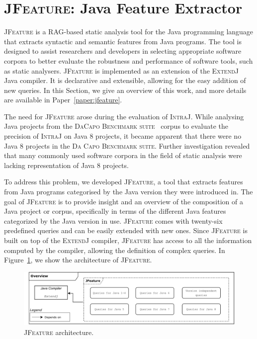 \section{\textsc{JFeature}: Java Feature Extractor}
\label{sec:JFeature}
\textsc{JFeature} is a RAG-based static analysis tool for the Java programming language that extracts
syntactic and semantic features from Java programs. The tool is designed to assist
researchers and developers in selecting appropriate software corpora to better evaluate the robustness
and performance of software tools, such as static analysers.
\textsc{JFeature} is implemented as an extension of the \textsc{ExtendJ} Java compiler. It is declarative
and extensible, allowing for the easy addition of new queries. In this Section,
we give an overview of this work, and more details are available in Paper~\ref{paper:jfeature}.

The need for \textsc{JFeature} arose during the evaluation of \textsc{IntraJ}.
While analysing Java projects from the \textsc{DaCapo Benchmark suite}~\cite{DaCapo:paper} corpus to evaluate the precision
of \textsc{IntraJ} on Java 8 projects, it became apparent that there were no Java 8 projects
in the \textsc{Da Capo Benchmark suite}. Further investigation revealed that many
commonly used software corpora in the field of static analysis were lacking
representation of Java 8 projects.

To address this problem, we developed \textsc{JFeature}, a tool that extracts features from
Java programs categorised by the Java version they were introduced in.
The goal of \textsc{JFeature} is to provide insight and an overview of
the composition of a Java project or corpus, specifically in terms of the different
Java features categorized by the Java version in use.
\textsc{JFeature} comes with twenty-six predefined queries and can be easily extended
with new ones. Since \textsc{JFeature} is built on top of the \textsc{ExtendJ} compiler, \textsc{JFeature} has access
to all the information computed by the compiler, allowing the definition of complex
queries.
In Figure~\ref{fig:JFeature}, we show the architecture of \textsc{JFeature}.
\begin{figure}[H]
  \centering
  \includegraphics[width=1\textwidth]{kappa/img/JFeature.pdf}
  \caption{\label{fig:JFeature} \textsc{JFeature} architecture.}
\end{figure}

